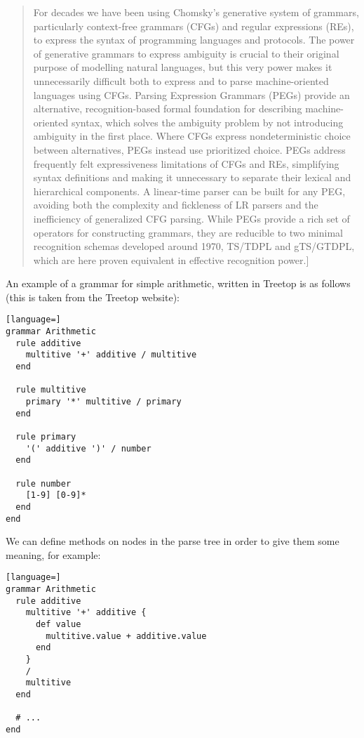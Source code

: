 \begin{quote}
For decades we have been using Chomsky's generative system of grammars, particularly context-free grammars (CFGs) and regular expressions (REs), to express the syntax of programming languages and protocols. The power of generative grammars to express ambiguity is crucial to their original purpose of modelling natural languages, but this very power makes it unnecessarily difficult both to express and to parse machine-oriented languages using CFGs. Parsing Expression Grammars (PEGs) provide an alternative, recognition-based formal foundation for describing machine-oriented syntax, which solves the ambiguity problem by not introducing ambiguity in the first place. Where CFGs express nondeterministic choice between alternatives, PEGs instead use prioritized choice. PEGs address frequently felt expressiveness limitations of CFGs and REs, simplifying syntax definitions and making it unnecessary to separate their lexical and hierarchical components. A linear-time parser can be built for any PEG, avoiding both the complexity and fickleness of LR parsers and the inefficiency of generalized CFG parsing. While PEGs provide a rich set of operators for constructing grammars, they are reducible to two minimal recognition schemas developed around 1970, TS/TDPL and gTS/GTDPL, which are here proven equivalent in effective recognition power.]
\end{quote}

An example of a grammar for simple arithmetic, written in Treetop is as follows (this is taken from the Treetop website):

\begin{lstlisting}[language=]
grammar Arithmetic
  rule additive
    multitive '+' additive / multitive
  end

  rule multitive
    primary '*' multitive / primary
  end

  rule primary
    '(' additive ')' / number
  end

  rule number
    [1-9] [0-9]*
  end
end
\end{lstlisting}

We can define methods on nodes in the parse tree in order to give them some meaning, for example:

\begin{lstlisting}[language=]
grammar Arithmetic
  rule additive
    multitive '+' additive {
      def value
        multitive.value + additive.value
      end
    }
    /
    multitive
  end
  
  # ...
end
\end{lstlisting}


